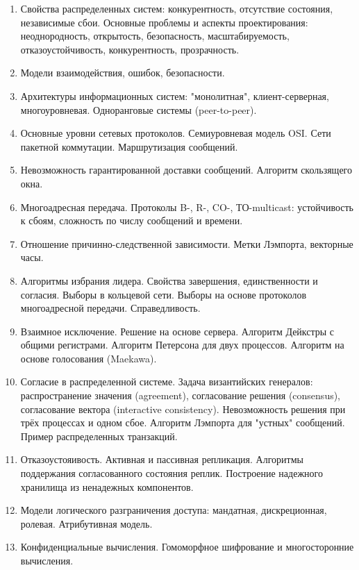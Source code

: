 \documentclass[specialist, subf, href, colorlinks=true, 14pt, times, mtpro, final]{report}
\theoremstyle{definition}
\begin{document}
\begin{enumerate}
\item Свойства распределенных систем: конкурентность, отсутствие состояния, независимые сбои. Основные проблемы и аспекты проектирования: неоднородность, открытость, безопасность, масштабируемость, отказоустойчивость, конкурентность, прозрачность.
\item Модели взаимодействия, ошибок, безопасности.
\item Архитектуры информационных систем: "монолитная", клиент-серверная, многоуровневая. Одноранговые системы (peer-to-peer).
\item Основные уровни сетевых протоколов. Семиуровневая модель OSI. Сети пакетной коммутации. Маршрутизация сообщений.
\item Невозможность гарантированной доставки сообщений. Алгоритм скользящего окна.
\item Многоадресная передача. Протоколы B-, R-, CO-, ТО-multicast: устойчивость к сбоям, сложность по числу сообщений и времени.
\item Отношение причинно-следственной зависимости. Метки Лэмпорта, векторные часы.
\item Алгоритмы избрания лидера. Свойства завершения, единственности и согласия. Выборы в кольцевой сети. Выборы на основе протоколов многоадресной передачи. Справедливость.
\item Взаимное исключение. Решение на основе сервера. Алгоритм Дейкстры с общими регистрами. Алгоритм Петерсона для двух процессов. Алгоритм на основе голосования (Maekawa).
\item Согласие в распределенной системе. Задача византийских генералов: распространение значения (agreement), согласование решения (consensus), согласование вектора (interactive consistency). Невозможность решения при трёх процессах и одном сбое. Алгоритм Лэмпорта для "устных" сообщений. Пример распределенных транзакций.
\item Отказоустояивость. Активная и пассивная репликация. Алгоритмы поддержания согласованного состояния реплик. Построение надежного хранилища из ненадежных компонентов.
\item Модели логического разграничения доступа: мандатная, дискреционная, ролевая. Атрибутивная модель.
\item Конфиденциальные вычисления. Гомоморфное шифрование и многосторонние вычисления.
	\end{enumerate}
\end{document}
